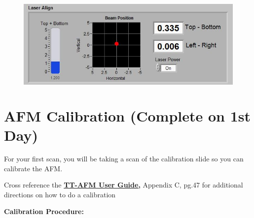 \documentclass{../lab}
\begin{document}
\begin{figure}[h]
    \centering
    \href{http://dev-physicsadv.pantheon.berkeley.edu/sites/default/files/AFMImages/detectoralign.JPG}{\includegraphics[width=0.5\linewidth]{images/detectoralign.JPG}}
    \caption{}
    \label{fig:detectoralign}
\end{figure}

\section{AFM Calibration (Complete on 1st Day)}

For your first scan, you will be taking a scan of the calibration slide so you can calibrate the AFM.

Cross reference the \href{http://experimentationlab.berkeley.edu/tt-afmuserguidev2.2}{\textbf{TT-AFM User Guide,}} Appendix C, pg.47 for additional directions on how to do a calibration

\textbf{Calibration Procedure:}
\end{document}
